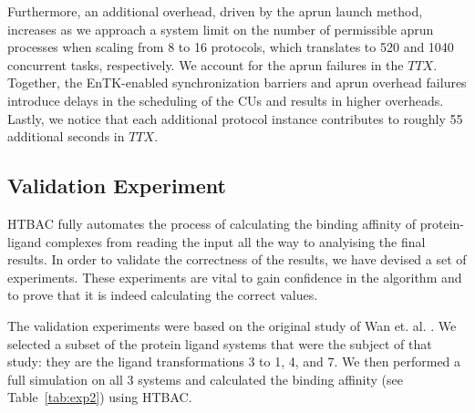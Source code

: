 Furthermore, an additional overhead, driven by the aprun launch method,
increases as we approach a system limit on the number of permissible aprun
processes when scaling from 8 to 16 protocols, which translates to 520 and
1040 concurrent tasks, respectively. We account for the aprun failures in the
\(TTX\). Together, the EnTK-enabled synchronization barriers and aprun
overhead failures introduce delays in the scheduling of the CUs and results in
higher overheads. Lastly, we notice that each additional protocol instance
contributes to roughly 55 additional seconds in \(TTX\).  








\subsection{Validation Experiment}

HTBAC fully automates the process of calculating the binding affinity of
protein-ligand complexes from reading the input all the way to analyising the
final results. In order to validate the correctness of the results, we have
devised a set of experiments. These experiments are vital to gain confidence
in the algorithm and to prove that it is indeed calculating the correct values.

The validation experiments were based on the original study of Wan et. al.
\cite{Wan2017brd4}. We selected a subset of the protein ligand systems that
were the subject of that study: they are the ligand transformations 3 to 1, 4,
and 7. We then performed a full simulation on all 3 systems and calculated the
binding affinity (see Table~\ref{tab:exp2}) using HTBAC.

